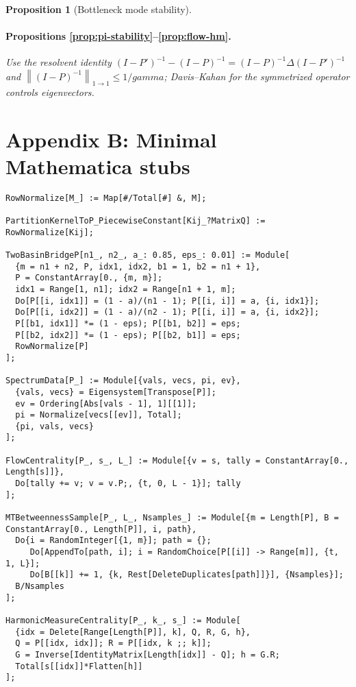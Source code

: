 \documentclass[11pt]{article}
\def\sgap{gamma}%
\newcommand{\1}{\mathbbm{1}}
\newcommand{\norm}[1]{\left\lVert #1 \right\rVert}
\newcommand{\sgap}{\gamma}
\theoremstyle{plain}
\newtheorem{proposition}[theorem]{Proposition}
\theoremstyle{definition}
\begin{document}
\begin{proposition}[Bottleneck mode stability]
\paragraph{Propositions \ref{prop:pi-stability}--\ref{prop:flow-hm}.}
Use the resolvent identity $(I-P')^{-1}-(I-P)^{-1}=(I-P)^{-1}\Delta(I-P')^{-1}$ and $\norm{(I-P)^{-1}}_{1\to 1}\le 1/\sgap$; Davis--Kahan for the symmetrized operator controls eigenvectors.

\section*{Appendix B: Minimal Mathematica stubs}
\small
\begin{verbatim}
RowNormalize[M_] := Map[#/Total[#] &, M];

PartitionKernelToP_PiecewiseConstant[Kij_?MatrixQ] := RowNormalize[Kij];

TwoBasinBridgeP[n1_, n2_, a_: 0.85, eps_: 0.01] := Module[
  {m = n1 + n2, P, idx1, idx2, b1 = 1, b2 = n1 + 1},
  P = ConstantArray[0., {m, m}];
  idx1 = Range[1, n1]; idx2 = Range[n1 + 1, m];
  Do[P[[i, idx1]] = (1 - a)/(n1 - 1); P[[i, i]] = a, {i, idx1}];
  Do[P[[i, idx2]] = (1 - a)/(n2 - 1); P[[i, i]] = a, {i, idx2}];
  P[[b1, idx1]] *= (1 - eps); P[[b1, b2]] = eps;
  P[[b2, idx2]] *= (1 - eps); P[[b2, b1]] = eps;
  RowNormalize[P]
];

SpectrumData[P_] := Module[{vals, vecs, pi, ev},
  {vals, vecs} = Eigensystem[Transpose[P]];
  ev = Ordering[Abs[vals - 1], 1][[1]];
  pi = Normalize[vecs[[ev]], Total];
  {pi, vals, vecs}
];

FlowCentrality[P_, s_, L_] := Module[{v = s, tally = ConstantArray[0., Length[s]]},
  Do[tally += v; v = v.P;, {t, 0, L - 1}]; tally
];

MTBetweennessSample[P_, L_, Nsamples_] := Module[{m = Length[P], B = ConstantArray[0., Length[P]], i, path},
  Do{i = RandomInteger[{1, m}]; path = {};
     Do[AppendTo[path, i]; i = RandomChoice[P[[i]] -> Range[m]], {t, 1, L}];
     Do[B[[k]] += 1, {k, Rest[DeleteDuplicates[path]]}], {Nsamples}];
  B/Nsamples
];

HarmonicMeasureCentrality[P_, k_, s_] := Module[
  {idx = Delete[Range[Length[P]], k], Q, R, G, h},
  Q = P[[idx, idx]]; R = P[[idx, k ;; k]];
  G = Inverse[IdentityMatrix[Length[idx]] - Q]; h = G.R;
  Total[s[[idx]]*Flatten[h]]
];
\end{verbatim}

\normalsize


\end{proposition}
\end{document}
